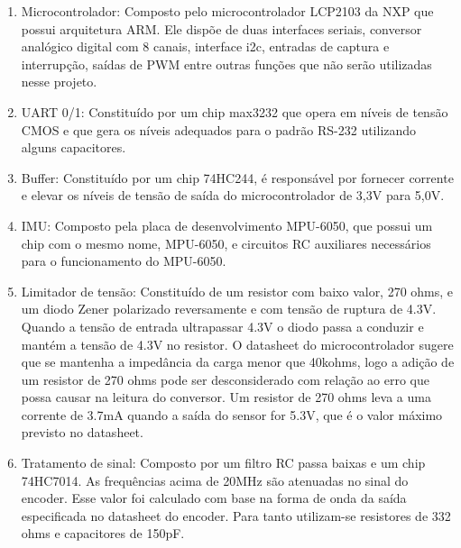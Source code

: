 \begin{enumerate}[topsep=0pt, partopsep=0pt, itemsep=0pt]
    \item Microcontrolador: Composto pelo microcontrolador LCP2103 da NXP que possui arquitetura ARM. Ele dispõe de duas interfaces seriais, conversor analógico digital com 8 canais, interface i2c, entradas de captura e interrupção, saídas de PWM entre outras funções que não serão utilizadas nesse projeto.
    \item UART 0/1: Constituído por um chip max3232 que opera em níveis de tensão CMOS e que gera os níveis adequados para o padrão RS-232 utilizando alguns capacitores.
    \item Buffer: Constituído por um chip 74HC244, é responsável por fornecer corrente e elevar os níveis de tensão de saída do microcontrolador de 3,3V para 5,0V.
    \item IMU: Composto pela placa de desenvolvimento MPU-6050, que possui um chip com o mesmo nome, MPU-6050, e circuitos RC auxiliares necessários para o funcionamento do MPU-6050.
    \item Limitador de tensão: Constituído de um resistor com baixo valor, 270 ohms, e um diodo Zener polarizado reversamente e com tensão de ruptura de 4.3V. Quando a tensão de entrada ultrapassar 4.3V o diodo passa a conduzir e mantém a tensão de 4.3V no resistor. O datasheet do microcontrolador sugere que se mantenha a impedância da carga menor que 40kohms, logo a adição de um resistor de 270 ohms pode ser desconsiderado com relação ao erro que possa causar na leitura do conversor. Um resistor de 270 ohms leva a uma corrente de 3.7mA quando a saída do sensor for 5.3V, que é o valor máximo previsto no datasheet.
    \item Tratamento de sinal: Composto por um filtro RC passa baixas e um chip 74HC7014. As frequências acima de 20MHz são atenuadas no sinal do encoder. Esse valor foi calculado com base na forma de onda da saída especificada no datasheet do encoder. Para tanto utilizam-se resistores de 332 ohms e capacitores de 150pF.
\end{enumerate}
